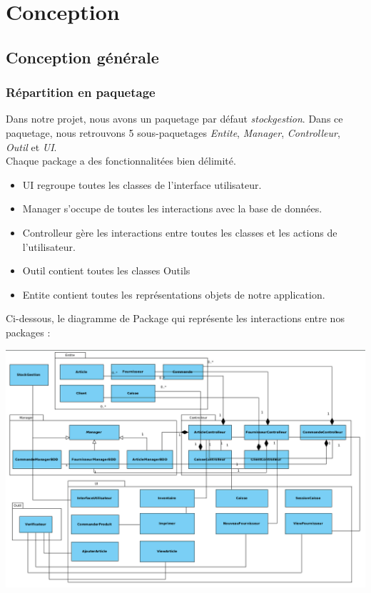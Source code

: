 \part{Conception}

\chapter{Conception générale}

\section{Répartition en paquetage}

Dans notre projet, nous avons un paquetage par défaut \textit{stockgestion}. Dans ce paquetage, nous retrouvons 5 sous-paquetages \textit{Entite}, \textit{Manager}, \textit{Controlleur}, \textit{Outil} et \textit{UI}.\\

Chaque package a des fonctionnalitées bien délimité. 
\begin{itemize}
	\item UI regroupe toutes les classes de l'interface utilisateur.
	\item Manager s'occupe de toutes les interactions avec la base de données.
	\item Controlleur gère les interactions entre toutes les classes et les actions de l'utilisateur.
	\item Outil contient toutes les classes Outils
	\item Entite contient toutes les représentations objets de notre application.
\end{itemize}

Ci-dessous, le diagramme de Package qui représente les interactions entre nos packages :
\begin{center}
\includegraphics[width=14cm]{./Conception/DiagrammeDeClassePackage}
\end{center}

